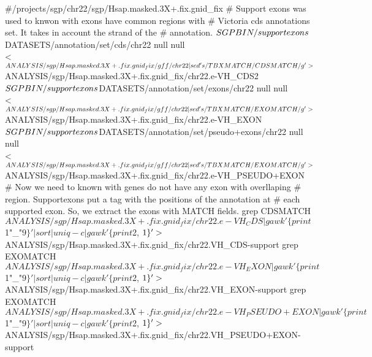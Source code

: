 \documentclass[11pt]{article}
\begin{document}
\nwenddocs{}\plusendmoddef
#/projects/sgp/chr22/sgp/Hsap.masked.3X+.fix.gnid_fix
# Support exons was used to knwon with exons have common regions with 
# Victoria cds annotations set. It takes in account the strand of the 
# annotation.
$SGPBIN/supportexons \\
    $DATASETS/annotation/set/cds/chr22 null null \\
    < $ANALYSIS/sgp/Hsap.masked.3X+.fix.gnid_fix/gff/chr22 |\\
    sed 's/TBXMATCH/CDSMATCH/g' \\
    > $ANALYSIS/sgp/Hsap.masked.3X+.fix.gnid_fix/chr22.e-VH_CDS2
$SGPBIN/supportexons \\
    $DATASETS/annotation/set/exons/chr22 null null \\
    < $ANALYSIS/sgp/Hsap.masked.3X+.fix.gnid_fix/gff/chr22 |\\
    sed 's/TBXMATCH/EXOMATCH/g' \\
    > $ANALYSIS/sgp/Hsap.masked.3X+.fix.gnid_fix/chr22.e-VH_EXON
$SGPBIN/supportexons \\
    $DATASETS/annotation/set/pseudo+exons/chr22 null null \\
    < $ANALYSIS/sgp/Hsap.masked.3X+.fix.gnid_fix/gff/chr22 |\\
    sed 's/TBXMATCH/EXOMATCH/g' \\
    > $ANALYSIS/sgp/Hsap.masked.3X+.fix.gnid_fix/chr22.e-VH_PSEUDO+EXON
# Now we need to known with genes do not have any exon with overllaping
# region. Supportexons put a tag with the positions of the annotation at 
# each supported exon. So, we extract the exons with MATCH fields.
grep CDSMATCH $ANALYSIS/sgp/Hsap.masked.3X+.fix.gnid_fix/chr22.e-VH_CDS |
    gawk '\{print $1"_"$9\}' | sort | uniq -c | gawk '\{print $2, $1\}' \\
    >  $ANALYSIS/sgp/Hsap.masked.3X+.fix.gnid_fix/chr22.VH_CDS-support
grep EXOMATCH $ANALYSIS/sgp/Hsap.masked.3X+.fix.gnid_fix/chr22.e-VH_EXON |
    gawk '\{print $1"_"$9\}' | sort | uniq -c | gawk '\{print $2, $1\}' \\
    >  $ANALYSIS/sgp/Hsap.masked.3X+.fix.gnid_fix/chr22.VH_EXON-support
grep EXOMATCH $ANALYSIS/sgp/Hsap.masked.3X+.fix.gnid_fix/chr22.e-VH_PSEUDO+EXON |
    gawk '\{print $1"_"$9\}' | sort | uniq -c | gawk '\{print $2, $1\}' \\
    > $ANALYSIS/sgp/Hsap.masked.3X+.fix.gnid_fix/chr22.VH_PSEUDO+EXON-support
\end{document}
